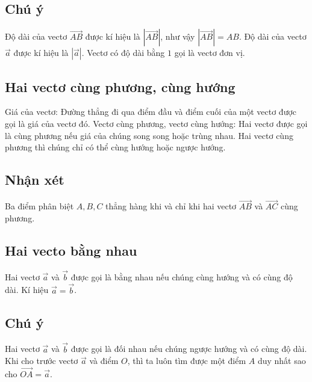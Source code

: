 \subsection{Chú ý}
\begin{note}
    Độ dài của vectơ $\vec{AB}$ được kí hiệu là $\left|\vec{AB}\right|$, như vậy $\left|\vec{AB}\right| = AB$. Độ dài của vectơ $\vec{a}$ được kí hiệu là $\left|\vec{a}\right|$.
    Vectơ có độ dài bằng $1$ gọi là vectơ đơn vị.
\end{note}

\subsection{Hai vectơ cùng phương, cùng hướng}
\begin{dn}
    Giá của vectơ: Đường thẳng đi qua điểm đầu và điểm cuối của một vectơ được gọi là giá của vectơ đó.
    Vectơ cùng phương, vectơ cùng hướng: Hai vectơ được gọi là cùng phương nếu giá của chúng song song hoặc trùng nhau.
    Hai vectơ cùng phương thì chúng chỉ có thể cùng hướng hoặc ngược hướng.
\end{dn}

\subsection{Nhận xét}
\begin{note}
    Ba điểm phân biệt $A, B, C$ thẳng hàng khi và chỉ khi hai vectơ $\vec{AB}$ và $\vec{AC}$ cùng phương.
\end{note}

\subsection{Hai vecto bằng nhau}
\begin{dn}
    Hai vectơ $\vec{a}$ và $\vec{b}$ được gọi là bằng nhau nếu chúng cùng hướng và có cùng độ dài.
    Kí hiệu $\vec{a} = \vec{b}$.
\end{dn}

\subsection{Chú ý}
\begin{note}
    Hai vectơ $\vec{a}$ và $\vec{b}$ được gọi là đối nhau nếu chúng ngược hướng và có cùng độ dài.
    Khi cho trước vectơ $\vec{a}$ và điểm $O$, thì ta luôn tìm được một điểm $A$ duy nhất sao cho $\vec{OA} = \vec{a}$.
\end{note}

